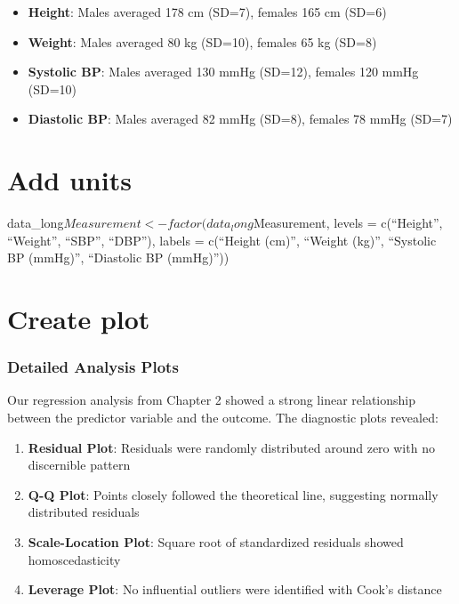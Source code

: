 \documentclass[
  letterpaper,
  oneside,
  openany]{MastersDoctoralThesis}
\providecommand{\tightlist}{%
  \setlength{\itemsep}{0pt}\setlength{\parskip}{0pt}}\usepackage{longtable,booktabs,array}
\begin{document}
\begin{itemize}
\tightlist
\item
  \textbf{Height}: Males averaged 178 cm (SD=7), females 165 cm (SD=6)
\item
  \textbf{Weight}: Males averaged 80 kg (SD=10), females 65 kg (SD=8)
\item
  \textbf{Systolic BP}: Males averaged 130 mmHg (SD=12), females 120
  mmHg (SD=10)
\item
  \textbf{Diastolic BP}: Males averaged 82 mmHg (SD=8), females 78 mmHg
  (SD=7)
\end{itemize}

\chapter{Add units}\label{add-units}

data\_long\(Measurement <- factor(data_long\)Measurement, levels =
c(``Height'', ``Weight'', ``SBP'', ``DBP''), labels = c(``Height (cm)'',
``Weight (kg)'', ``Systolic BP (mmHg)'', ``Diastolic BP (mmHg)''))

\chapter{Create plot}\label{create-plot}

\subsection{Detailed Analysis Plots}\label{sec-app-b-analysis-plots}

Our regression analysis from Chapter 2 showed a strong linear
relationship between the predictor variable and the outcome. The
diagnostic plots revealed:

\begin{enumerate}
\def\labelenumi{\arabic{enumi}.}
\tightlist
\item
  \textbf{Residual Plot}: Residuals were randomly distributed around
  zero with no discernible pattern
\item
  \textbf{Q-Q Plot}: Points closely followed the theoretical line,
  suggesting normally distributed residuals
\item
  \textbf{Scale-Location Plot}: Square root of standardized residuals
  showed homoscedasticity
\item
  \textbf{Leverage Plot}: No influential outliers were identified with
  Cook's distance
\end{enumerate}
\end{document}
